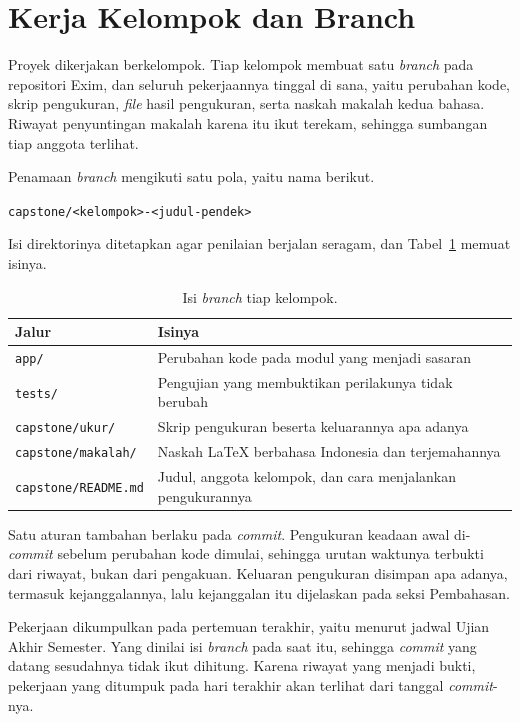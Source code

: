 \section{Kerja Kelompok dan Branch}

Proyek dikerjakan berkelompok. Tiap kelompok membuat satu \textit{branch} pada
repositori Exim, dan seluruh pekerjaannya tinggal di sana, yaitu perubahan
kode, skrip pengukuran, \textit{file} hasil pengukuran, serta naskah makalah kedua
bahasa. Riwayat penyuntingan makalah karena itu ikut terekam, sehingga
sumbangan tiap anggota terlihat.

Penamaan \textit{branch} mengikuti satu pola, yaitu nama berikut.

\begin{center}
  \texttt{capstone/<kelompok>-<judul-pendek>}
\end{center}

Isi direktorinya ditetapkan agar penilaian berjalan seragam, dan
Tabel~\ref{tab:isi-branch} memuat isinya.

\begin{table}[htbp]
  \centering
  \caption{Isi \textit{branch} tiap kelompok.}
  \label{tab:isi-branch}
  \begin{tabularx}{\textwidth}{|l|X|}
    \hline
    \textbf{Jalur} & \textbf{Isinya} \\
    \hline
    \texttt{app/} & Perubahan kode pada modul yang menjadi sasaran \\
    \hline
    \texttt{tests/} & Pengujian yang membuktikan perilakunya tidak berubah \\
    \hline
    \texttt{capstone/ukur/} & Skrip pengukuran beserta keluarannya apa adanya \\
    \hline
    \texttt{capstone/makalah/} & Naskah LaTeX berbahasa Indonesia dan terjemahannya \\
    \hline
    \texttt{capstone/README.md} & Judul, anggota kelompok, dan cara menjalankan pengukurannya \\
    \hline
  \end{tabularx}
\end{table}

Satu aturan tambahan berlaku pada \textit{commit}. Pengukuran keadaan awal
di-\textit{commit} sebelum perubahan kode dimulai, sehingga urutan waktunya
terbukti dari riwayat, bukan dari pengakuan. Keluaran pengukuran disimpan apa
adanya, termasuk kejanggalannya, lalu kejanggalan itu dijelaskan pada seksi
Pembahasan.

Pekerjaan dikumpulkan pada pertemuan terakhir, yaitu menurut jadwal Ujian
Akhir Semester. Yang dinilai isi \textit{branch} pada saat itu, sehingga
\textit{commit} yang datang sesudahnya tidak ikut dihitung. Karena riwayat
yang menjadi bukti, pekerjaan yang ditumpuk pada hari terakhir akan terlihat
dari tanggal \textit{commit}-nya.

